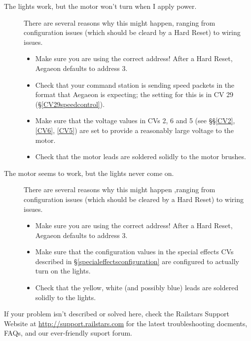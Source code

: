 \documentclass[12pt,letterpaper,draft]{memoir} %
\begin{document}
\begin{description}
\item[The lights work, but the motor won't turn when I apply power.] There are several reasons why this might happen, ranging from configuration issues (which should be cleard by a Hard Reset) to wiring issues.

	\begin{itemize}
	\item Make sure you are using the correct address! After a Hard Reset, Aegaeon defaults to address 3.
	\item Check that your command station is sending speed packets in the format that Aegaeon is expecting; the setting for this is in CV 29 (\S\ref{CV29speedcontrol}).
   \item Make sure that the voltage values in CVs 2, 6 and 5 (see \S\S\ref{CV2}, \ref{CV6}, \ref{CV5}) are set to provide a reasonably large voltage to the motor.
	\item Check that the motor leads are soldered solidly to the motor brushes.
	\end{itemize}

\item[The motor seems to work, but the lights never come on.] There are several reasons why this might happen ,ranging from configuration issues (which should be cleared by a Hard Reset) to wiring issues.

	\begin{itemize}
	\item Make sure you are using the correct address! After a Hard Reset, Aegaeon defaults to address 3.
   \item Make sure that the configuration values in the special effects CVs described in \S\ref{specialeffectsconfiguration} are configured to actually turn on the lights.
	\item Check that the yellow, white (and possibly blue) leads are soldered solidly to the lights.
	\end{itemize}

\end{description}

If your problem isn't described or solved here, check the Railstars Support Website at \url{http://support.railstars.com} for the latest troubleshooting docments, FAQs, and our ever-friendly suport forum.


\appendix
\end{document}
